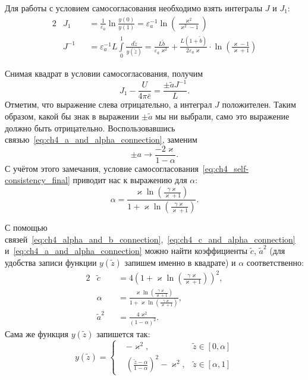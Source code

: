 \documentclass[a4paper, 12pt]{extarticle}
\def \ve {\varepsilon}
\def \vk {\varkappa}
\def \tz {\tilde{z}}
\def \ta {\tilde{a}}
\def \tc {\tilde{c}}
\def \tb {\tilde{b}}
\begin{document}
Для работы с условием самосогласования необходимо взять интегралы $J$ и $J_1$:
\begin{alignat}{2}
	&J_1 &&= \frac{1}{\ve_a}\ln{\frac{y(0)}{y(1)}} = \ve_a^{-1} \ln{\left( \frac{\vk^2}{\vk^2-1} \right)}\label{eq:ch4_J1_straight}\\
	&J^{-1} &&= \ve_a^{-1}L\int\limits_0^{1} \frac{d\tz}{y(\tz)} = \frac{L\tb}{\ve_a\vk^2} + \frac{L(1+\tb)}{2\ve_a\vk}\cdot \ln{\left( \frac{\vk-1}{\vk+1} \right)}\label{eq:ch4_J_straight}
\end{alignat}

Снимая квадрат в условии самосогласования, получим
\begin{equation}
J_1 - \frac{U}{4\pi\bar{e}} = \frac{\pm \ta J^{-1}}{L}.\label{eq:ch4_self-consistency_final}
\end{equation}
Отметим, что выражение слева отрицательно, а интеграл $J$ положителен.
Таким образом, какой бы знак в выражении $\pm\ta$ мы ни выбрали, само это выражение должно быть отрицательно.
Воспользовавшись связью~\eqref{eq:ch4_a_and_alpha_connection}, заменим
$$
\pm a \to \frac{-2\vk}{1-\alpha}.
$$
С учётом этого замечания, условие самосогласования~\eqref{eq:ch4_self-consistency_final} приводит нас к выражению для $\alpha$:
\begin{equation}
	\alpha = \frac{\vk\ln{\left(\frac{\gamma\vk}{\vk+1}\right)}}{1+\vk\ln{\left(\frac{\gamma\vk}{\vk+1}\right)}}.\label{eq:ch4_alpha_result}
\end{equation} 

С помощью связей~\eqref{eq:ch4_alpha_and_b_connection},~\eqref{eq:ch4_c_and_alpha_connection} и~\eqref{eq:ch4_a_and_alpha_connection} можно найти коэффициенты $\tc$, $\ta^2$ (для удобства записи функции $y(\tz)$ запишем именно в квадрате) и $\alpha$ соответственно:
\begin{alignat}{2}
	&\tc &&= 4\left(1+\vk\ln{\left(\frac{\gamma\vk}{\vk+1}\right)}\right)^2,\\
	&\alpha &&= \frac{\vk\ln{\left(\frac{\gamma\vk}{\vk+1}\right)}}{1+\vk\ln{\left(\frac{\gamma\vk}{\vk+1}\right)}},\\
	&\ta^2 &&= \frac{4\vk^2}{(1-\alpha)^2}.	
\end{alignat}
Сама же функция $y(\tz)$ запишется так:
\begin{equation}\label{eq:ch4_general_2}
	y(\tz) = \left\{
	\begin{aligned}
		&-\vk^2, &\tz\in [0,\alpha]\\
		&\left( \frac{\tz-\alpha}{1-\alpha} \right)^2 - \vk^2, &\tz\in [\alpha, 1]
	\end{aligned}
	\right.
\end{equation}
\end{document}
